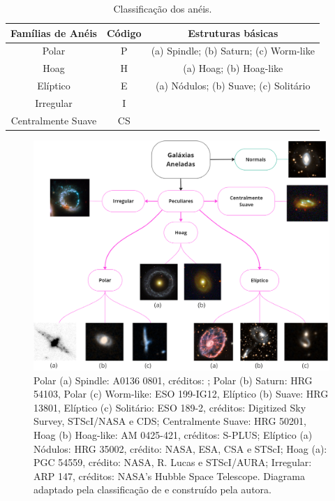 \begin{table}[h]
  \centering
  \begin{tabular}{ccc}
    \toprule
    \textbf{Famílias de Anéis} & \textbf{Código} & \textbf{Estruturas básicas} \\
    \midrule
    Polar & P & (a) Spindle; (b) Saturn; (c) Worm-like \\
    Hoag & H & (a) Hoag; (b) Hoag-like \\
    Elíptico & E & (a) Nódulos; (b) Suave; (c) Solitário \\
    Irregular & I &  \\
    Centralmente Suave & CS &  \\
    \bottomrule
  \end{tabular}
  \caption{Classificação dos anéis\protect\footnotemark.}
  \label{tab:minha_tabela}
\end{table}

\begin{figure}[t]
  \centering 
  \includegraphics[width=1.0\textwidth]{Imagens/quadro.png} 
  \caption[Família dos anéis]{Polar (a) Spindle: A0136 0801, créditos: \cite{1995AIPC}; Polar (b) Saturn: HRG 54103, Polar (c) Worm-like: ESO 199-IG12, Elíptico (b) Suave: HRG 13801, Elíptico (c) Solitário: ESO 189-2, créditos: Digitized Sky Survey, STScI/NASA e CDS; Centralmente Suave: HRG 50201, Hoag (b) Hoag-like: AM 0425-421, créditos: S-PLUS; Elíptico (a) Nódulos: HRG 35002, crédito: NASA, ESA, CSA e STScI; Hoag (a): PGC 54559, crédito: NASA, R. Lucas e STScI/AURA; Irregular: ARP 147, créditos: NASA's Hubble Space Telescope. Diagrama adaptado pela classificação de  e construído pela autora.}
  \label{fig:quadro} 
\end{figure}

